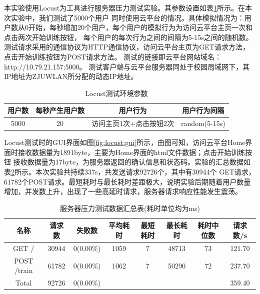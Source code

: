 本实验使用Locust\cite{locust}为工具进行服务器压力测试实验。其参数设置如表\ref{table:locust:param}所示。在本次实验中，我们测试了5000个用户
同时使用云平台的情况。具体模拟情况为：用户数从0开始，每秒增加20个用户，每个用户的模拟行为为访问云平台主页一次和点击两次开始训练按钮，
每个用户的每次行为之间的间隔为5-15s之间的随机数。测试请求采用的通信协议为HTTP通信协议，访问云平台主页为GET请求方法，点击开始训练按钮为POST请求方法。
测试的链接即云平台网站域名：http://10.79.21.157:5000。
测试客户端与云平台服务器同处于校园局域网下，其IP地址为ZJUWLAN所分配的动态IP地址。

{
    \begin{table}[htb]   
        \caption{Locust测试环境参数}
        \label{table:locust:param}
        \centering
        \begin{tabular}[t]{cccc}
            \hline
            用户数 & 每秒产生用户数 & 用户行为 & 用户行为间隔 \\
            \hline
            5000 & 20 & 访问主页1次+点击按钮2次  & random(5-15s) \\
            \hline
        \end{tabular}
    \end{table}
}

Locust测试时的GUI界面如图\ref{fig:locust:gui}所示，由图可知，访问云平台Home界面时接收数据量为1891byte，主要为Home界面的html文件数据；点击开始训练按钮
接收数据量为17byte，为服务器返回的确认信息和状态码。实验的汇总数据如表\ref{table:locust:data}所示。本次实验共持续337s，共发送请求92726个，其中有30944个
GET请求，61782个POST请求。最短耗时与最长耗时差距极大，说明实验后期随着用户数量增加，并发数上升，出现了一些高延时请求，服务器请求响应性能发生震荡。

{
    \begin{table}[htb]   
        \caption{服务器压力测试数据汇总表(耗时单位均为ms)}
        \label{table:locust:data}
        \centering
        \begin{tabular}[t]{cccccccc}
            \hline
            名称 & 请求数 & 失败数 & 平均耗时 & 最短耗时 & 最长耗时 & 耗时中位数 & 请求数/s \\
            \hline
            GET \quad / & 30944 & 0(0.00\%) & 1059 & 7 & 48713 & 73 & 121.70 \\
            POST \quad /train & 61782 & 0(0.00\%) & 1062 & 7 & 50290 & 72 & 237.70 \\ 
            \hline
            Total & 92726 & 0(0.00\%) & & & & & 359.40 \\
            \hline
        \end{tabular}
    \end{table}
}



